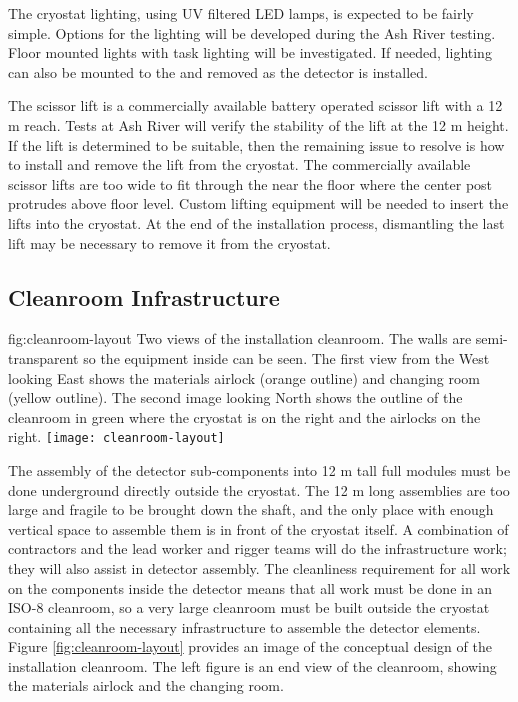 The cryostat lighting, using UV filtered LED lamps, is expected to be fairly simple. Options for the lighting will be developed during the Ash River testing. Floor mounted lights with task lighting will be investigated. If needed, lighting can also be mounted to the  and removed as the detector is installed.

The scissor lift is a commercially available battery operated scissor lift with a 12 \si{m} reach. Tests at Ash River will verify the stability of the lift at the 12 \si{m} height. If the lift is determined to be suitable, then the remaining issue to resolve is how to install and remove the lift from the cryostat. The commercially available scissor lifts are too wide to fit through the  near the floor where the center post protrudes above floor level. Custom lifting equipment will be needed to insert the lifts into the cryostat. At the end of the installation process, dismantling the last lift may be necessary to remove it from the cryostat.

\clearpage

\subsection{Cleanroom Infrastructure}
\label{sec:fdsp-tc-infr-comm}

\begin{dunefigure}{fig:cleanroom-layout}
  {Two views of the installation cleanroom. The walls are semi-transparent so the equipment inside can be seen. The first view from the West looking East shows the materials airlock (orange outline) and changing room (yellow outline). The second image looking North shows the outline of the cleanroom in green where the cryostat is on the right and the airlocks on the right.} 
\texttt{[image: cleanroom-layout]}
\end{dunefigure}

The assembly of the detector sub-components into 12 \si{m} tall full modules must be done underground directly outside the cryostat. The 12 \si{m} long assemblies are too large and fragile to be brought down the shaft, and the only place with enough vertical space to assemble them is in front of the cryostat itself. A combination of contractors and the lead worker and rigger teams will do the infrastructure work; they will also assist in detector assembly. The cleanliness requirement for all work on the components inside the detector means that all work must be done in an ISO-8 cleanroom, so a very large cleanroom must be built outside the cryostat containing all the necessary infrastructure to assemble the detector  elements. Figure \ref{fig:cleanroom-layout} provides an image of the conceptual design of the installation cleanroom. The left figure is an end view of the cleanroom, showing the materials airlock and the changing room. 

